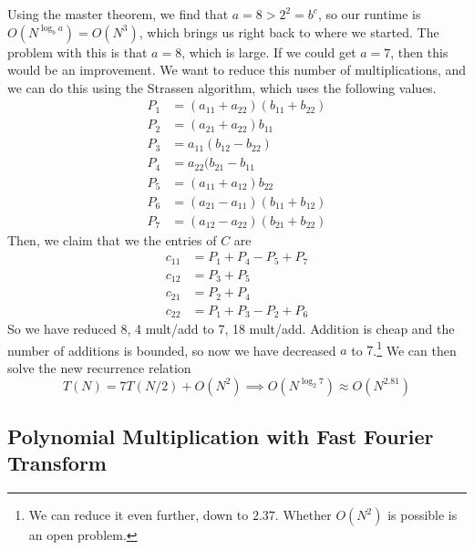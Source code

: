     Using the master theorem, we find that $a = 8 > 2^2 = b^c$, so our runtime is $O(N^{\log_{b} a}) = O(N^3)$, which brings us right back to where we started. The problem with this is that $a = 8$, which is large. If we could get $a = 7$, then this would be an improvement. We want to reduce this number of multiplications, and we can do this using the Strassen algorithm, which uses the following values.  
    \begin{align*}
      P_1 &= (a_{11} + a_{22}) (b_{11} + b_{22}) \\
      P_2 &= (a_{21} + a_{22}) b_{11} \\
      P_3 &= a_{11} (b_{12} - b_{22}) \\
      P_4 &= a_{22} (b_{21} - b_{11} \\
      P_5 &= (a_{11} + a_{12}) b_{22} \\
      P_6 &= (a_{21} - a_{11}) (b_{11} + b_{12}) \\
      P_7 &= (a_{12} - a_{22}) (b_{21} + b_{22}) 
    \end{align*}
    Then, we claim that we the entries of $C$ are 
    \begin{align*}
        c_{11} &= P_1 + P_4 - P_5 + P_7 \\
        c_{12} &= P_3 + P_5 \\
        c_{21} &= P_2 + P_4 \\
        c_{22} &= P_1 + P_3 - P_2 + P_6
    \end{align*}
    So we have reduced 8, 4 mult/add to 7, 18 mult/add. Addition is cheap and the number of additions is bounded, so now we have decreased $a$ to $7$.\footnote{We can reduce it even further, down to $2.37$. Whether $O(N^2)$ is possible is an open problem. } We can then solve the new recurrence relation 
    \begin{equation}
      T(N) = 7 T(N/2) + O(N^2) \implies O(N^{\log_2 7}) \approx O(N^{2.81})
    \end{equation}

\subsection{Polynomial Multiplication with Fast Fourier Transform}

